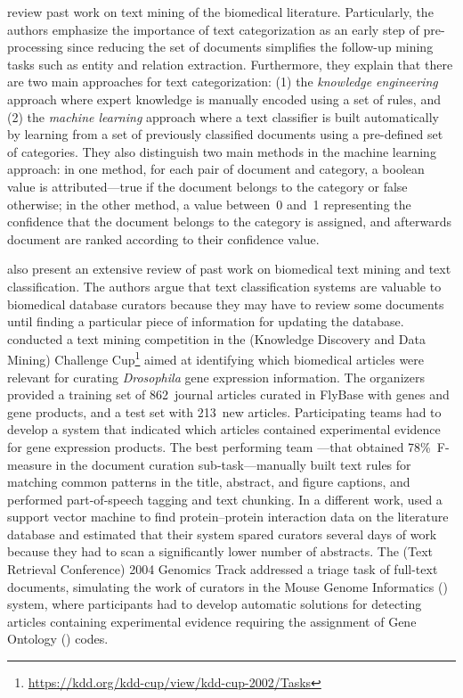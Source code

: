 \textcite{feldman2003a} review past work on text mining of the biomedical literature.
Particularly, the authors emphasize the importance of text categorization as an early step of pre-processing since reducing the set of documents simplifies the follow-up mining tasks such as entity and relation extraction.
Furthermore, they explain that there are two main approaches for text categorization: (1) the \textit{knowledge engineering} approach where expert knowledge is manually encoded using a set of rules, and (2) the \textit{machine learning} approach where a text classifier is built automatically by learning from a set of previously classified documents using a pre-defined set of categories.
They also distinguish two main methods in the machine learning approach: in one method, for each pair of document and category, a boolean value is attributed---true if the document belongs to the category or false otherwise; in the other method, a value between~0 and~1 representing the confidence that the document belongs to the category is assigned, and afterwards document are ranked according to their confidence value.

\textcite{cohen2005a} also present an extensive review of past work on biomedical text mining and text classification.
The authors argue that text classification systems are valuable to biomedical database curators because they may have to review some documents until finding a particular piece of information for updating the database.
\textcite{yeh2003a} conducted a text mining competition in the  (Knowledge Discovery and Data Mining) Challenge Cup\footnote{\url{https://kdd.org/kdd-cup/view/kdd-cup-2002/Tasks}} aimed at identifying which biomedical articles were relevant for curating \textit{Drosophila} gene expression information.
The organizers provided a training set of 862~journal articles curated in FlyBase \parencite{theflybase2002a} with genes and gene products, and a test set with 213~new articles.
Participating teams had to develop a system that indicated which articles contained experimental evidence for gene expression products.
The best performing team \parencite{regev2003a}---that obtained 78\%~F-measure in the document curation sub-task---manually built text rules for matching common patterns in the title, abstract, and figure captions, and performed part-of-speech tagging and text chunking.
In a different work, \textcite{donaldson2003a} used a support vector machine to find protein--protein interaction data on the  literature database and estimated that their system spared curators several days of work because they had to scan a significantly lower number of abstracts.
The  (Text Retrieval Conference) 2004 Genomics Track \parencite{voorhees2004a,hersh2004b,hersh2005a} addressed a triage task of full-text documents, simulating the work of curators in the Mouse Genome Informatics () system, where participants had to develop automatic solutions for detecting articles containing experimental evidence requiring the assignment of Gene Ontology () codes.

